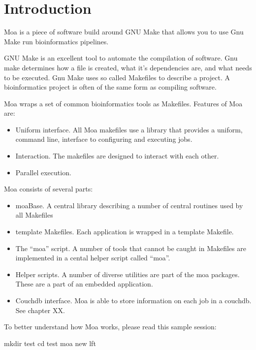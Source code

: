 \chapter{Introduction}

Moa is a piece of software build around GNU Make \citep{Gnumake} that
allows you to use Gnu Make run bioinformatics pipelines. 

GNU Make is an excellent tool to automate the compilation of
software. Gnu make determines how a file is created, what it's
dependencies are, and what needs to be executed. Gnu Make uses so
called Makefiles to describe a project. A bioinformatics project is
often of the same form as compiling software.

Moa wraps a set of common bioinformatics tools as Makefiles. Features
of Moa are:

\begin{itemize}
\item Uniform interface. All Moa makefiles use a library that provides
  a uniform, command line, interface to configuring and executing jobs.
\item Interaction. The makefiles are designed to interact with each
  other.
\item Parallel execution. 
\end{itemize}

Moa consists of several parts:

\begin{itemize}
\item moaBase. A central library describing a number of central
  routines used by all Makefiles
\item template Makefiles. Each application is wrapped in a template
  Makefile. 
\item The ``moa'' script. A number of tools that cannot be caught in
  Makefiles are implemented in a cental helper script called ``moa''.
\item Helper scripts. A number of diverse utilities are part of the
  moa packages. These are a part of an embedded application.
\item Couchdb interface. Moa is able to store information on each job
  in a couchdb. See chapter XX.
\end{itemize}

To better understand how Moa works, please read this sample session:

\begin{bash}
mkdir test
cd test
moa new lft
\end{bash}



